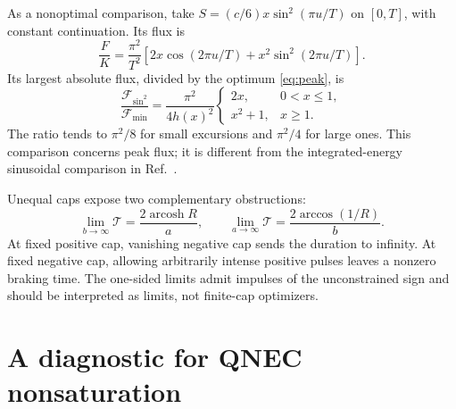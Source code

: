 \documentclass[10pt]{article}
\newcommand{\arcosh}{\operatorname{arcosh}}
\begin{document}
As a nonoptimal comparison, take $S=(c/6)x\sin^2(\pi u/T)$ on $[0,T]$,
with constant continuation. Its flux is
\begin{equation}
 \frac{F}{K}=\frac{\pi^2}{T^2}
 \left[2x\cos(2\pi u/T)+x^2\sin^2(2\pi u/T)\right].
\end{equation}
Its largest absolute flux, divided by the optimum \eqref{eq:peak}, is
\begin{equation}
 \frac{\mathcal F_{\sin^2}}{\mathcal F_{\min}}
 =\frac{\pi^2}{4h(x)^2}
 \begin{cases}2x,&0<x\le1,\\x^2+1,&x\ge1.\end{cases}
 \label{eq:sin}
\end{equation}
The ratio tends to $\pi^2/8$ for small excursions and $\pi^2/4$ for large
ones. This comparison concerns peak flux; it is different from the
integrated-energy sinusoidal comparison in Ref.~\cite{KD}.

Unequal caps expose two complementary obstructions:
\begin{equation}
 \lim_{b\to\infty}\mathcal T=\frac{2\arcosh R}{a},\qquad
 \lim_{a\to\infty}\mathcal T=\frac{2\arccos(1/R)}{b}.
 \label{eq:limits}
\end{equation}
At fixed positive cap, vanishing negative cap sends the duration to infinity.
At fixed negative cap, allowing arbitrarily intense positive pulses leaves
a nonzero braking time. The one-sided limits admit impulses of the unconstrained
sign and should be interpreted as limits, not finite-cap optimizers.

\section{A diagnostic for QNEC nonsaturation}
\end{document}

